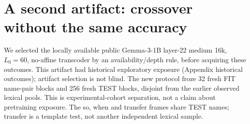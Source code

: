 \section{A second artifact: crossover without the same accuracy}\label{sec:second}
We selected the locally available public Gemma-3-1B layer-22 medium 16k, $L_0=60$, no-affine transcoder by an availability/depth rule, before acquiring these outcomes. This artifact had historical exploratory exposure (Appendix historical outcomes); artifact selection is not blind. The new protocol froze 32 fresh FIT name-pair blocks and 256 fresh TEST blocks, disjoint from the earlier observed lexical pools. This is experimental-cohort separation, not a claim about pretraining exposure. The so, when and transfer frames share TEST names; transfer is a template test, not another independent lexical sample.

